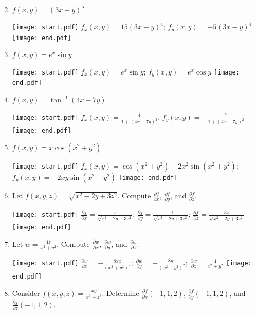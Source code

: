 \documentclass[12pt]{article}
\begin{document}

\begin{enumerate}
\setcounter{enumi}{1}

\item $f(x,y)=(3x-y)^5$

\texttt{[image: start.pdf]}
{{$f_x(x,y)=15(3x-y)^4$; $f_y(x,y)=-5(3x-y)^4$}}
\texttt{[image: end.pdf]}


\item $f(x,y)=e^x\sin{y}$

\texttt{[image: start.pdf]}
{{$f_x(x,y)=e^x\sin{y}$; $f_y(x,y)=e^x\cos{y}$}}
\texttt{[image: end.pdf]}


\item $f(x,y)=\tan^{-1}{(4x-7y)}$

\texttt{[image: start.pdf]}
{{$f_x(x,y)=\frac{4}{1+(4x-7y)^2}$; $f_y(x,y)=-\frac{7}{1+(4x-7y)^2}$}}
\texttt{[image: end.pdf]}


\item $f(x,y)=x\cos{(x^2+y^2)}$

\texttt{[image: start.pdf]}
{{$f_x(x,y)=\cos{(x^2+y^2)}-2x^2\sin{(x^2+y^2)}$; $f_y(x,y)=-2xy\sin{(x^2+y^2)}$}}
\texttt{[image: end.pdf]}


\item Let $f(x,y,z)=\sqrt{x^2-2y+3z^2}$.  Compute $\frac{\partial f}{\partial x}$,  $\frac{\partial f}{\partial y}$, and $\frac{\partial f}{\partial z}$.

\texttt{[image: start.pdf]}
{{$\frac{\partial f}{\partial x}=\frac{x}{\sqrt{x^2-2y+3z^2}}$; $\frac{\partial f}{\partial y}=\frac{-1}{\sqrt{x^2-2y+3z^2}}$; $\frac{\partial f}{\partial z}=\frac{3z}{\sqrt{x^2-2y+3z^2}}$}}
\texttt{[image: end.pdf]}


\item Let $w=\frac{4z}{x^2+y^2}$.  Compute $\frac{\partial w}{\partial x}$, $\frac{\partial w}{\partial y}$, and $\frac{\partial w}{\partial z}$.

\texttt{[image: start.pdf]}
{{$\frac{\partial w}{\partial x}=-\frac{8xz}{(x^2+y^2)^2}$; $\frac{\partial w}{\partial y}=-\frac{8yz}{(x^2+y^2)^2}$; $\frac{\partial w}{\partial z}=\frac{4}{x^2+y^2}$}}
\texttt{[image: end.pdf]}


\item Consider $f(x,y,z)=\frac{xy}{x^2+z^2}$.  Determine $\frac{\partial f}{\partial x}(-1, 1, 2)$, $\frac{\partial f}{\partial y}(-1, 1, 2)$, and $\frac{\partial f}{\partial z}(-1, 1, 2)$.


\end{enumerate}
\end{document}
